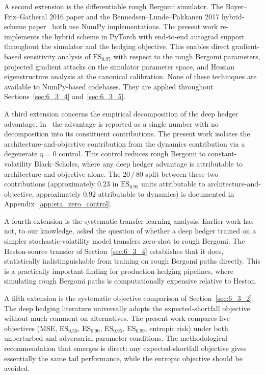 \documentclass[12pt,a4paper]{article}
\theoremstyle{definition}
\theoremstyle{plain}
\theoremstyle{remark}
\theoremstyle{plain}
\begin{document}
A second extension is the differentiable rough Bergomi simulator.
The Bayer--Friz--Gatheral 2016 paper and the
Bennedsen--Lunde--Pakkanen 2017 hybrid-scheme
paper~\cite{BennedsenLundePakkanen2017} both use NumPy
implementations. The present work re-implements the hybrid scheme in
PyTorch with end-to-end autograd support throughout the simulator
and the hedging objective. This enables direct gradient-based
sensitivity analysis of $\mathrm{ES}_{0.95}$ with respect to the
rough Bergomi parameters, projected gradient attacks on the
simulator parameter space, and Hessian eigenstructure analysis at
the canonical calibration. None of these techniques are available to
NumPy-based codebases. They are applied throughout
Sections~\ref{sec:6_3_4} and~\ref{sec:6_3_5}.

A third extension concerns the empirical decomposition of the deep
hedger advantage. In~\cite{Horvath2021DeepRough} the advantage is
reported as a single number with no decomposition into its
constituent contributions. The present work isolates the
architecture-and-objective contribution from the dynamics
contribution via a degenerate $\eta = 0$ control. This control
reduces rough Bergomi to constant-volatility Black--Scholes, where
any deep hedger advantage is attributable to architecture and
objective alone. The $20\,/\,80$ split between these two
contributions (approximately $0.23$ in $\mathrm{ES}_{0.95}$ units
attributable to architecture-and-objective, approximately $0.92$
attributable to dynamics) is documented in
Appendix~\ref{app:eta_zero_control}.

A fourth extension is the systematic transfer-learning analysis.
Earlier work has not, to our knowledge, asked the question of
whether a deep hedger trained on a simpler stochastic-volatility
model transfers zero-shot to rough Bergomi. The Heston-source
transfer of Section~\ref{sec:6_3_4} establishes that it does,
statistically indistinguishable from training on rough Bergomi paths
directly. This is a practically important finding for production
hedging pipelines, where simulating rough Bergomi paths is
computationally expensive relative to Heston.

A fifth extension is the systematic objective comparison of
Section~\ref{sec:6_3_2}. The deep hedging literature universally
adopts the expected-shortfall objective without much comment on
alternatives. The present work compares five objectives
(MSE, $\mathrm{ES}_{0.50}$, $\mathrm{ES}_{0.90}$,
$\mathrm{ES}_{0.95}$, $\mathrm{ES}_{0.99}$, entropic risk) under
both unperturbed and adversarial parameter conditions. The
methodological recommendation that emerges is direct: any
expected-shortfall objective gives essentially the same tail
performance, while the entropic objective should be avoided.
\end{document}
